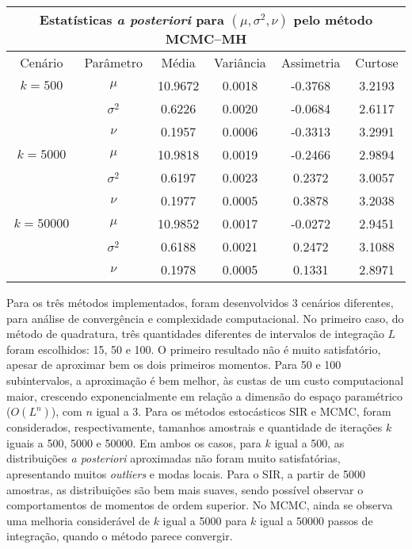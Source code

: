 \begin{table}[htb]
\begin{tabular}{cccccc}
		\midrule
		\multicolumn{6}{c}{Estatísticas \textit{a posteriori} para $(\mu, \sigma^2, \nu)$ pelo método MCMC--MH} \\
		\midrule
		Cenário & Parâmetro & Média & Variância & Assimetria & Curtose \\
		\midrule
		$k = 500$ & $\mu$ & 10.9672 & 0.0018 & -0.3768 & 3.2193 \\
		& $\sigma^2$ & 0.6226 & 0.0020 & -0.0684 & 2.6117 \\
		& $\nu$      & 0.1957 & 0.0006 & -0.3313 & 3.2991 \\
		\midrule
		$k = 5000$ & $\mu$ & 10.9818 & 0.0019 & -0.2466 & 2.9894 \\
		& $\sigma^2$ & 0.6197 & 0.0023 & 0.2372 & 3.0057 \\
		& $\nu$      & 0.1977 & 0.0005 & 0.3878 & 3.2038 \\
		\midrule
		$k = 50000$ & $\mu$ & 10.9852 & 0.0017 & -0.0272 & 2.9451 \\
		& $\sigma^2$ & 0.6188 & 0.0021 & 0.2472 & 3.1088 \\
		& $\nu$      & 0.1978 & 0.0005 & 0.1331 & 2.8971 \\
		\bottomrule
	\end{tabular}
\end{table}

Para os três métodos implementados, foram desenvolvidos 3 cenários diferentes, para análise de convergência e complexidade computacional. No primeiro caso, do método de quadratura, três quantidades diferentes de intervalos de integração $L$ foram escolhidos: 15, 50 e 100. O primeiro resultado não é muito satisfatório, apesar de aproximar bem os dois primeiros momentos. Para 50 e 100 subintervalos, a aproximação é bem melhor, às custas de um custo computacional maior, crescendo exponencialmente em relação a dimensão do espaço paramétrico ($O(L^n)$), com $n$ igual a 3. Para os métodos estocásticos SIR e MCMC, foram considerados, respectivamente, tamanhos amostrais e quantidade de iterações $k$ iguais a 500, 5000 e 50000. Em ambos os casos, para $k$ igual a 500, as distribuições \textit{a posteriori} aproximadas não foram muito satisfatórias, apresentando muitos \textit{outliers} e modas locais. Para o SIR, a partir de 5000 amostras, as distribuições são bem mais suaves, sendo possível observar o comportamentos de momentos de ordem superior. No MCMC, ainda se observa uma melhoria considerável de $k$ igual a 5000 para $k$ igual a 50000 passos de integração, quando o método parece convergir.

